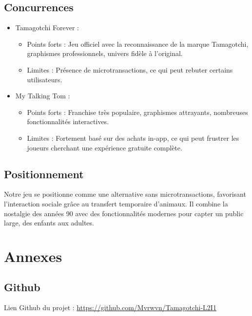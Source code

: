 \documentclass{cahier_des_charges}
\begin{document}
\subsection{Concurrences}
\begin{itemize}[label=\textbullet]
\item Tamagotchi Forever :
\begin{itemize}[label=\textendash]
\item Points forts : Jeu officiel avec la reconnaissance de la marque Tamagotchi,
graphismes professionnels, univers fidèle à l’original.
\item Limites : Présence de microtransactions, ce qui peut rebuter certains utilisateurs.
\end{itemize}
\item My Talking Tom :
\begin{itemize}[label=\textendash]
\item Points forts : Franchise très populaire, graphismes attrayants, nombreuses
fonctionnalités interactives.
\item Limites : Fortement basé sur des achats in-app, ce qui peut frustrer les joueurs
cherchant une expérience gratuite complète.
\end{itemize}
\end{itemize}
\subsection{Positionnement}
Notre jeu se positionne comme une alternative sans microtransactions, favorisant l’interaction
sociale grâce au transfert temporaire d’animaux. Il combine la nostalgie des années 90 avec des
fonctionnalités modernes pour capter un public large, des enfants aux adultes.
\section{Annexes}
\subsection{Github}
Lien Github du projet : \href{https://github.com/Mvrwvn/Tamagotchi-L2I1}{https://github.com/Mvrwvn/Tamagotchi-L2I1}
\end{document}
